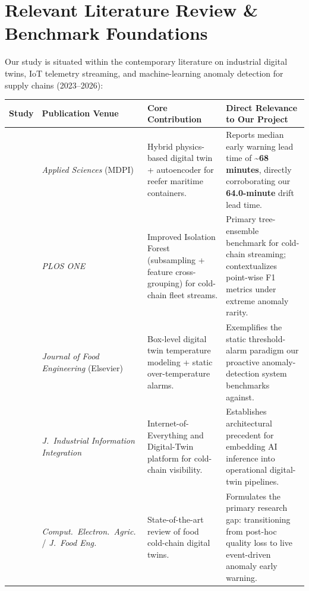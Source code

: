 \documentclass[11pt,a4paper,oneside]{article}
\begin{document}
\section{Relevant Literature Review \& Benchmark Foundations}

Our study is situated within the contemporary literature on industrial digital twins, IoT telemetry streaming, and machine-learning anomaly detection for supply chains (2023--2026):

\begin{table}[H]
\centering
\small
\renewcommand{\arraystretch}{1.2}
\begin{tabularx}{\textwidth}{L{3.0cm} L{3.5cm} Y Y}
\toprule
{}
\textbf{Study} & \textbf{Publication Venue} & \textbf{Core Contribution} & \textbf{Direct Relevance to Our Project} \\
\midrule
\textbf{\citet{vuksic2026early}} & \textit{Applied Sciences} (MDPI) & Hybrid physics-based digital twin + autoencoder for reefer maritime containers. & Reports median early warning lead time of \textbf{\~{}68 minutes}, directly corroborating our \textbf{64.0-minute} drift lead time. \\
\addlinespace
\textbf{\citet{xie2025anomaly}} & \textit{PLOS ONE} & Improved Isolation Forest (subsampling + feature cross-grouping) for cold-chain fleet streams. & Primary tree-ensemble benchmark for cold-chain streaming; contextualizes point-wise F1 metrics under extreme anomaly rarity. \\
\addlinespace
\textbf{\citet{meng2024costeffective}} & \textit{Journal of Food Engineering} (Elsevier) & Box-level digital twin temperature modeling + static over-temperature alarms. & Exemplifies the static threshold-alarm paradigm our proactive anomaly-detection system benchmarks against. \\
\addlinespace
\textbf{\citet{wu2023internet}} & \textit{J.\ Industrial Information Integration} & Internet-of-Everything and Digital-Twin platform for cold-chain visibility. & Establishes architectural precedent for embedding AI inference into operational digital-twin pipelines. \\
\addlinespace
\textbf{\citet{defraeye2023digital}} & \textit{Comput.\ Electron.\ Agric.} / \textit{J.\ Food Eng.} & State-of-the-art review of food cold-chain digital twins. & Formulates the primary research gap: transitioning from post-hoc quality loss to live event-driven anomaly early warning. \\

\end{tabularx}
\end{table}
\end{document}
